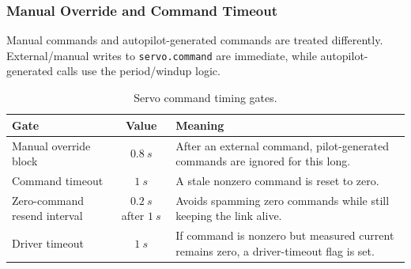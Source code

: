 \documentclass[10pt,twocolumn]{article}
\begin{document}
\subsubsection{Manual Override and Command Timeout}
Manual commands and autopilot-generated commands are treated differently.
External/manual writes to \texttt{servo.command} are immediate, while
autopilot-generated calls use the period/windup logic.
\begin{table}[!t]
\centering
\caption{Servo command timing gates.}
\label{tab:pypilot-servo-command-gates}
\begin{tabularx}{\columnwidth}{Z{0.33\columnwidth}cY}
\toprule
Gate & Value & Meaning \\
\midrule
Manual override block &
\(\SI{0.8}{s}\) &
After an external command, pilot-generated commands are ignored for this long. \\
Command timeout &
\(\SI{1}{s}\) &
A stale nonzero command is reset to zero. \\
Zero-command resend interval &
\(\SI{0.2}{s}\) after \(\SI{1}{s}\) &
Avoids spamming zero commands while still keeping the link alive. \\
Driver timeout &
\(\SI{1}{s}\) &
If command is nonzero but measured current remains zero, a driver-timeout flag is set. \\
\bottomrule
\end{tabularx}
\end{table}
\end{document}
